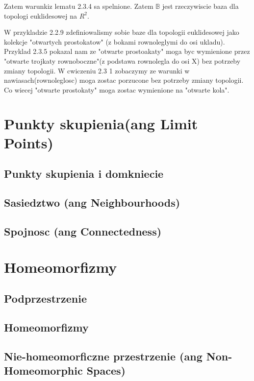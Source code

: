 \documentclass{article}
\begin{document}
Zatem warunkiz lematu 2.3.4 sa spelnione. Zatem $\mathbb{B}$ jest rzeczywiscie baza dla topologi euklidesowej na $R^{2}$.

\vspace{1cm}

W przykladzie 2.2.9 zdefiniowalismy sobie baze dla topologii euklidesowej jako kolekcje "otwartych prostokatow" (z bokami rownoleglymi do osi ukladu). Przyklad 2.3.5 pokazal nam ze "otwarte prostoakaty" moga byc wymienione przez "otwarte trojkaty rownoboczne"(z podstawa rownolegla do osi X) bez potrzeby zmiany topologii. W cwiczeniu 2.3 1 zobaczymy ze warunki w nawiasach(rownoleglosc) moga zostac porzucone bez potrzeby zmiany topologii. Co wiecej "otwarte prostokaty" moga zostac wymienione na "otwarte kola".
\section{Punkty skupienia(ang Limit Points)}

\subsection{Punkty skupienia i domkniecie}
\subsection{Sasiedztwo (ang Neighbourhoods)}
\subsection{Spojnosc (ang Connectedness)}

\section{Homeomorfizmy}

\subsection{Podprzestrzenie}
\subsection{Homeomorfizmy}
\subsection{Nie-homeomorficzne przestrzenie (ang Non-Homeomorphic Spaces)}
\end{document}
